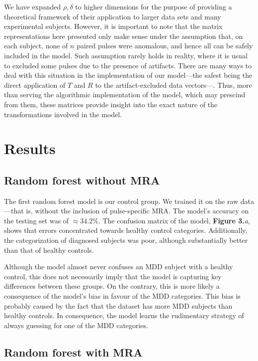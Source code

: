 \documentclass{article}
\begin{document}
\begin{multicols}{2}
We have expanded $\rho, \delta$ to higher dimensions for the purpose of
providing a theoretical framework of their application to larger data sets and
many experimental subjects. However, it is important to note that the matrix
representations here presented only make sense under the assumption that, on
each subject, none of $n$ paired pulses were anomalous, and hence all can be
safely included in the model. Such assumption rarely holds in reality, where it
is usual to excluded some pulses due to the presence of artifacts. There are
many ways to deal with this situation in the implementation of our model---the
safest being the direct application of $T$ and $R$ to the artifact-excluded data
vectors---. Thus, more than serving the algorithmic implementation of the model,
which may prescind from them, these matrices provide insight into the exact
nature of the transformations involved in the model.


\section{Results}

\subsection{Random forest without MRA}

The first random forest model is our control group. We trained it on the raw
data ---that is, without the inclusion of pulse-specific MRA. The model's
accuracy on the testing set was of $\approx34.2 \%$. The confusion matrix of the
model, \textbf{Figure 3.}\textit{a}, shows that errors concentrated towards
healthy control categories. Additionally, the categorization of diagnosed
subjects was poor, although substantially better than that of healthy controls. 

Although the model almost never confuses an MDD subject with a healthy control,
this does not necessarily imply that the model is capturing key differences
between these groups. On the contrary, this is more likely a consequence of the
model's bias in favour of the MDD categories. This bias is probably caused by
the fact that the dataset has more MDD subjects than healthy controls. In
consequence, the model learns the rudimentary strategy of always guessing for
one of the MDD categories.

\subsection{Random forest with MRA}


\end{multicols}
\end{document}
